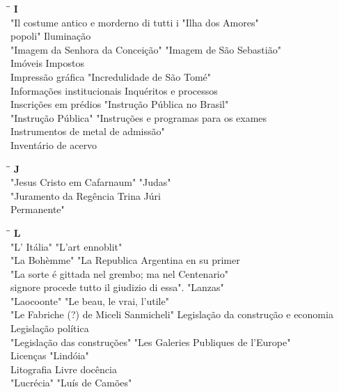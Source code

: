 \begin{tabbing}
	\hspace{8,7cm}\=\hspace{1cm}\=\kill
	\textbf{I} \>  \\ 
	"Il costume antico e morderno di tutti i \> "Ilha dos Amores"\\
	popoli" \> Iluminação\\
	"Imagem da Senhora da Conceição"\> "Imagem de São Sebastião"\\
	Imóveis \> Impostos\\ 
	Impressão gráfica \>  "Incredulidade de São Tomé"\\ 
	Informações institucionais \> Inquéritos e processos\\ 
	Inscrições em prédios \> "Instrução Pública no Brasil"\\
	"Instrução Pública" \> "Instruções e programas para os exames \\
	Instrumentos de metal \> de admissão"\\ 
	Inventário de acervo \> \\		   	   
\end{tabbing}

\begin{tabbing}
	\hspace{8,7cm}\=\hspace{1cm}\=\kill
	\textbf{J} \>  \\ 
	"Jesus Cristo em Cafarnaum" \> "Judas"\\
	"Juramento da Regência Trina \> Júri\\
	Permanente"\> \\	   	   
\end{tabbing}

\begin{tabbing}
	\hspace{8,7cm}\=\hspace{1cm}\=\kill
	\textbf{L} \>  \\ 
	"L' Itália" \> "L'art ennoblit"\\
	"La Bohèmme" \> "La Republica Argentina en su primer\\
	"La sorte é gittada nel grembo; ma nel\> Centenario"\\
	signore procede tutto il giudizio di essa". \> "Lanzas"\\ 
	"Laocoonte" \>  "Le beau, le vrai, l'utile"\\ 
	"Le Fabriche (?) de Miceli Sanmicheli" \> Legislação da construção e economia\\ 
	Legislação  \> política\\
	"Legislação das construções" \> "Les Galeries Publiques de l'Europe"\\
	Licenças \> "Lindóia"\\
	Litografia\> Livre docência\\
	"Lucrécia" \> "Luís de Camões"\\
\end{tabbing}

